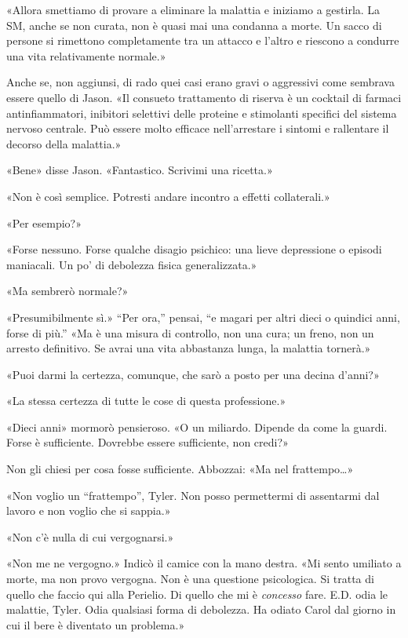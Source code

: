 «Allora smettiamo di provare a eliminare la malattia e iniziamo a
gestirla. La SM, anche se non curata, non è quasi mai una condanna a
morte. Un sacco di persone si rimettono completamente tra un attacco e
l'altro e riescono a condurre una vita relativamente normale.»

Anche se, non aggiunsi, di rado quei casi erano gravi o aggressivi come
sembrava essere quello di Jason. «Il consueto trattamento di riserva è
un cocktail di farmaci antinfiammatori, inibitori selettivi delle
proteine e stimolanti specifici del sistema nervoso centrale. Può essere
molto efficace nell'arrestare i sintomi e rallentare il decorso della
malattia.»

«Bene» disse Jason. «Fantastico. Scrivimi una ricetta.»

«Non è così semplice. Potresti andare incontro a effetti collaterali.»

«Per esempio?»

«Forse nessuno. Forse qualche disagio psichico: una lieve depressione o
episodi maniacali. Un po' di debolezza fisica generalizzata.»

«Ma sembrerò normale?»

«Presumibilmente sì.» ``Per ora,'' pensai, ``e magari per altri dieci o
quindici anni, forse di più.'' «Ma è una misura di controllo, non una
cura; un freno, non un arresto definitivo. Se avrai una vita abbastanza
lunga, la malattia tornerà.»

«Puoi darmi la certezza, comunque, che sarò a posto per una decina
d'anni?»

«La stessa certezza di tutte le cose di questa professione.»

«Dieci anni» mormorò pensieroso. «O un miliardo. Dipende da come la
guardi. Forse è sufficiente. Dovrebbe essere sufficiente, non credi?»

Non gli chiesi per cosa fosse sufficiente. Abbozzai: «Ma nel
frattempo\ldots»

«Non voglio un ``frattempo'', Tyler. Non posso permettermi di assentarmi
dal lavoro e non voglio che si sappia.»

«Non c'è nulla di cui vergognarsi.»

«Non me ne vergogno.» Indicò il camice con la mano destra. «Mi sento
umiliato a morte, ma non provo vergogna. Non è una questione
psicologica. Si tratta di quello che faccio qui alla Perielio. Di quello
che mi è \emph{concesso} fare. E.D. odia le malattie, Tyler. Odia
qualsiasi forma di debolezza. Ha odiato Carol dal giorno in cui il bere
è diventato un problema.»

